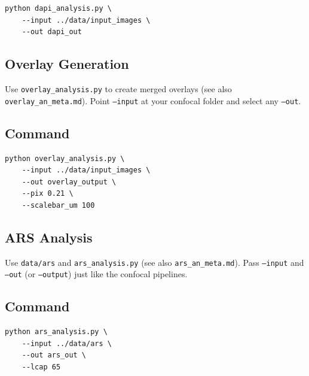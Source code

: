 \documentclass[11pt,a4paper]{article}
\begin{document}
\begin{center}
\begin{minipage}{0.9\linewidth}
\begin{verbatim}
python dapi_analysis.py \
    --input ../data/input_images \
    --out dapi_out
\end{verbatim}
\end{minipage}
\end{center}


\subsection{Overlay Generation}

Use \texttt{overlay\_analysis.py} to create merged overlays  
(see also \texttt{overlay\_an\_meta.md}).  
Point \texttt{--input} at your confocal folder and select any \texttt{--out}.

\subsection*{Command}

\begin{center}
\begin{minipage}{0.9\linewidth}
\begin{verbatim}
python overlay_analysis.py \
    --input ../data/input_images \
    --out overlay_output \
    --pix 0.21 \
    --scalebar_um 100
\end{verbatim}
\end{minipage}
\end{center}


\subsection{ARS Analysis}

Use \texttt{data/ars} and \texttt{ars\_analysis.py}  
(see also \texttt{ars\_an\_meta.md}).  
Pass \texttt{--input} and \texttt{--out} (or \texttt{--output}) just like the confocal pipelines.

\subsection*{Command}

\begin{center}
\begin{minipage}{0.9\linewidth}
\begin{verbatim}
python ars_analysis.py \
    --input ../data/ars \
    --out ars_out \
    --lcap 65
\end{verbatim}
\end{minipage}
\end{center}
\end{document}
